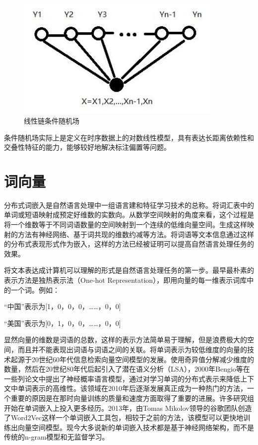 \documentclass[winfonts,master,oneside,nobackinfo]{njuthesis}
\begin{document}
\begin{figure}[h]
\centering
\begin{minipage}[t]{0.5\textwidth}
\includegraphics[width=0.9\textwidth]{./figure/线性链条件随机场.jpg}
\caption{线性链条件随机场}
\label{lab:1}
\end{minipage}
\end{figure}

条件随机场实际上是定义在时序数据上的对数线性模型，具有表达长距离依赖性和交叠性特征的能力，能够较好地解决标注偏置等问题。

\section{词向量}
分布式词嵌入是自然语言处理中一组语言建和特征学习技术的总称。将词汇表中的单词或短语映射成预定好维数的实数向。从数学空间映射的角度来看，这个过程是将一个维数等于不同词语数量的空间映射到一个连续的低维向量空间。生成这样映射的方法有神经网络、基于词共现的维数约减等方法。将词语等文本信息通过这样的分布式表现形式作为嵌入，这样的方法已经被证明可以提高自然语言处理任务的效果。

将文本表达成计算机可以理解的形式是自然语言处理任务的第一步。最早最朴素的表示方法是独热表示法（One-hot Representation），即用向量的每一维表示词库中的一个词。例如：

“中国”表示为[1，0，0，0，……，0，0]

“美国”表示为[0，1，0，0，……，0，0]

显然向量的维数是词语的总数，这样的表示方法简单易于理解，但是浪费极大的空间，而且并不能表现出词语与词语之间的关联。将单词表示为较低维度的向量的技术起源于20世纪60年代信息检索向量空间模型的发展。使用奇异值分解减少维度的数量，然后在20世纪80年代后起引入了潜在语义分析（LSA），2000年Bengio等\cite{Bengio}在一些列论文中提出了神经概率语言模型，通过对学习单词的分布式表示来降低上下文中单词表示的高维性。该领域在2010年后逐渐发展真正成为一种热门的方法，一个重要的原因是在那时向量训练的质量和速度方面取得了重要的进展。许多研究组开始在单词嵌入上投入更多经历。2013年，由Tomas Mikolov领导的谷歌团队创造了Word2Vec这样一个单词嵌入工具包，相较于之前的方法，该模型可以更快地训练出向量空间模型。现今大多说新的单词嵌入技术都是基于神经网络架构，而不是传统的n-gram模型和无监督学习。
\end{document}
